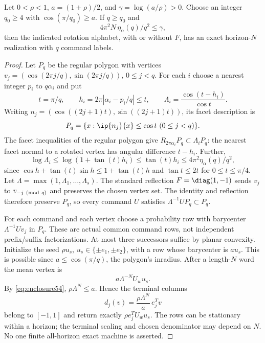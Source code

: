 \begin{proposition}\label{prop:polygon54}
Let $0<\rho<1$, $a=(1+\rho)/2$, and $\gamma=\log(a/\rho)>0$. Choose an integer $q_0\ge4$ with $\cos(\pi/q_0)\ge a$. If $q\ge q_0$ and
\begin{equation}\label{eq:enclosure54}
                4\pi^2N\,\eta_\alpha(q)/q^2\le\gamma,
\end{equation}
then the indicated rotation alphabet, with or without $F$, has an exact horizon-$N$ realization with $q$ command labels.
\end{proposition}
\begin{proof}
Let $P_q$ be the regular polygon with vertices $v_j=(\cos(2\pi j/q),\sin(2\pi j/q))$, $0\le j<q$. For each $i$ choose a nearest integer $p_i$ to $q\alpha_i$ and put
\[
 t=\pi/q,\qquad h_i=2\pi|\alpha_i-p_i/q|\le t,\qquad
 \Lambda_i=\frac{\cos(t-h_i)}{\cos t}.
\]
Writing $n_j=(\cos((2j+1)t),\sin((2j+1)t))$, its facet description is
\[
               P_q=\{x:\ip{n_j}{x}\le\cos t\ (0\le j<q)\}.
\]
The facet inequalities of the regular polygon give $R_{2\pi\alpha_i}P_q\subset\Lambda_iP_q$: the nearest facet normal to a rotated vertex has angular difference $t-h_i$. Further,
\[
 \log\Lambda_i
 \le\log(1+\tan(t)h_i)\le\tan(t)h_i
 \le4\pi^2\eta_\alpha(q)/q^2,
\]
since $\cos h+\tan(t)\sin h\le1+\tan(t)h$ and $\tan t\le2t$ for $0\le t\le\pi/4$. Let $\Lambda=\max(1,\Lambda_1,\ldots,\Lambda_s)$. The standard reflection $F=\diag(1,-1)$ sends $v_j$ to $v_{-j\ ({\rm mod}\ q)}$ and preserves the chosen vertex set. The identity and reflection therefore preserve $P_q$, so every command $U$ satisfies $\Lambda^{-1}UP_q\subset P_q$.

For each command and each vertex choose a probability row with barycenter $\Lambda^{-1}Uv_j$ in $P_q$. These are actual common command rows, not independent prefix/suffix factorizations. At most three successors suffice by planar convexity. Initialize the seed $\rho u_s$, $u_s\in\{\pm e_1,\pm e_2\}$, with a row whose barycenter is $au_s$. This is possible since $a\le\cos(\pi/q)$, the polygon's inradius. After a length-$N$ word the mean vertex is
\[
                         a\Lambda^{-N}U_wu_s.
\]
By \eqref{eq:enclosure54}, $\rho\Lambda^N\le a$. Hence the terminal columns
\[
                       d_j(v)=\frac{\rho\Lambda^N}{a}\,e_j^Tv
\]
belong to $[-1,1]$ and return exactly $\rho e_j^TU_wu_s$. The rows can be stationary within a horizon; the terminal scaling and chosen denominator may depend on $N$. No one finite all-horizon exact machine is asserted.
\end{proof}

